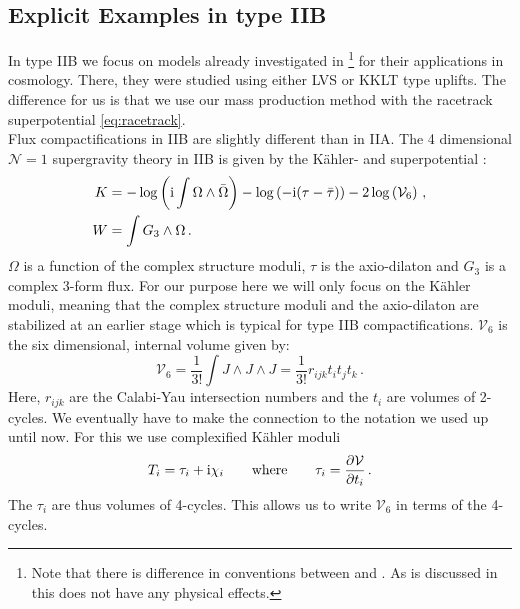 \documentclass[12pt]{report}
\newcommand{\be}{\begin{equation}}
\newcommand{\ee}{\end{equation}}
\newcommand{\bea}{\begin{equation}\begin{aligned}}
\newcommand{\eea}{\end{aligned}\end{equation}}
\def\rmi{{\rm i}}
\begin{document}
\subsection{Explicit Examples in type IIB}
In type IIB we focus on models already investigated in \cite{Cicoli:2008va,Cicoli:2008gp,Burgess:2016owb,Kallosh:2017wku,Bobkov:2010rf}\footnote{Note that there is difference in conventions between \cite{Cicoli:2008va,Cicoli:2008gp,Burgess:2016owb,Kallosh:2017wku,Bobkov:2010rf} and \cite{Cribiori:2019drf}. As is discussed in \cite{Cribiori:2019drf} this does not have any physical effects.}  for their applications in cosmology. There, they were studied using either LVS or KKLT type uplifts. The difference for us is that we use our mass production method with the racetrack superpotential \eqref{eq:racetrack}. \\

Flux compactifications in IIB are slightly different than in IIA. The 4 dimensional $\mathcal{N}=1$ supergravity theory in IIB is given by the Kähler- and superpotential \cite{Grimm:2004uq}:
\bea 
K &= -\log\left(\rmi \int \Omega \wedge \bar{\Omega} \right) - \log\left(-\rmi (\tau -\bar{\tau})\right) - 2 \log \left(\mathcal{V}_6\right)\,,\\
W &= \int G_3 \wedge \Omega\,.
\eea
$\Omega$ is a function of the complex structure moduli, $\tau$ is the axio-dilaton and $G_3$ is a complex 3-form flux. For our purpose here we will only focus on the Kähler moduli, meaning that the complex structure moduli and the axio-dilaton are stabilized at an earlier stage which is typical for type IIB compactifications. $\mathcal{V}_6$ is the six dimensional, internal volume given by:
\be 
\mathcal{V}_6 = \frac{1}{3!} \int J \wedge J \wedge J=\frac{1}{3!} r_{ijk}t_i t_j t_k\,.
\ee
Here, $r_{ijk}$ are the Calabi-Yau intersection numbers and the $t_i$ are volumes of 2-cycles. We eventually have to make the connection to the notation we used up until now. For this we use complexified Kähler moduli
\be 
T_i = \tau_i + \rmi \chi_i \qquad \text{where} \qquad \tau_i = \frac{\partial \mathcal{V}}{\partial t_i}\,.
\ee
The $\tau_i$ are thus volumes of 4-cycles. This allows us to write $\mathcal{V}_6$ in terms of the 4-cycles.\\
\end{document}
